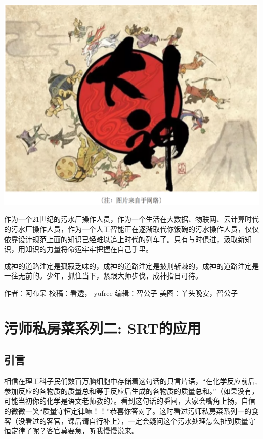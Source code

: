 \documentclass[]{book}
\begin{document}
\includegraphics[width=6.67in]{images/os4}

作为一个21世纪的污水厂操作人员，作为一个生活在大数据、物联网、云计算时代的污水厂操作人员，作为一个人工智能正在逐渐取代你饭碗的污水操作人员，仅仅依靠设计规范上面的知识已经难以追上时代的列车了。只有与时俱进，汲取新知识，用知识的力量将命运牢牢把握在自己手里。

成神的道路注定是孤寂乏味的，成神的道路注定是披荆斩棘的，成神的道路注定是一往无前的。少年，抓住当下，紧跟大师步伐，成神指日可待。

作者：阿布呆
校稿：看透， yufree
编辑：智公子
美图：丫头晚安，智公子

\hypertarget{ux6c61ux5e08ux79c1ux623fux83dcux7cfbux5217ux4e8c-srtux7684ux5e94ux7528}{%
\section{污师私房菜系列二: SRT的应用}\label{ux6c61ux5e08ux79c1ux623fux83dcux7cfbux5217ux4e8c-srtux7684ux5e94ux7528}}

\hypertarget{ux5f15ux8a00-3}{%
\subsection{引言}\label{ux5f15ux8a00-3}}

相信在理工科子民们数百万脑细胞中存储着这句话的只言片语，``在化学反应前后,参加反应的各物质的质量总和等于反应后生成的各物质的质量总和。''（如果没有，可能当初你的化学是语文老师教的）。看到这句话的瞬间，大家会嘴角上扬，自信的微微一笑``质量守恒定律嘛！！''恭喜你答对了。这时看过污师私房菜系列一的食客（没看过的客官，课后请自行补上），一定会疑问这个污水处理怎么扯到质量守恒定律了呢？客官莫要急，听我慢慢说来。
\end{document}
